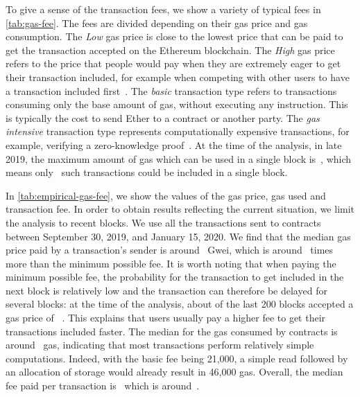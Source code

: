 To give a sense of the transaction fees, we show a variety of typical fees in \autoref{tab:gas-fee}. The fees are divided depending on their gas price and gas consumption. The \textit{Low} gas price is close to the lowest price that can be paid to get the transaction accepted on the Ethereum blockchain. The \textit{High} gas price refers to the price that people would pay when they are extremely eager to get their transaction included, for example when competing with other users to have a transaction included first~\cite{gas-price-history}. The \textit{basic} transaction type refers to transactions consuming only the base amount of gas, without executing any instruction. This is typically the cost to send Ether to a contract or another party. The \textit{gas intensive} transaction type represents computationally expensive transactions, for example, verifying a zero-knowledge proof~\cite{aztec-protocol}. At the time of the analysis, in late 2019, the maximum amount of gas which can be used in a single block is~, which means only~ such transactions could be included in a single block.

In \autoref{tab:empirical-gas-fee}, we show the values of the gas price, gas used and transaction fee.
In order to obtain results reflecting the current situation, we limit the analysis to recent blocks.
We use all the transactions sent to contracts between September 30, 2019, and January 15, 2020.
We find that the median gas price paid by a transaction's sender is around~ Gwei, which is around~ times more than the minimum possible fee.
It is worth noting that when paying the minimum possible fee, the probability for the transaction to get included in the next block is relatively low and the transaction can therefore be delayed for several blocks: at the time of the analysis, about  of the last 200 blocks accepted a gas price of ~\cite{eth-gas-station}.
This explains that users usually pay a higher fee to get their transactions included faster.
The median for the gas consumed by contracts is around~ gas, indicating that most transactions perform relatively simple computations.
Indeed, with the basic fee being 21,000, a simple read followed by an allocation of storage would already result in 46,000 gas.
Overall, the median fee paid per transaction is~ which is around~.



